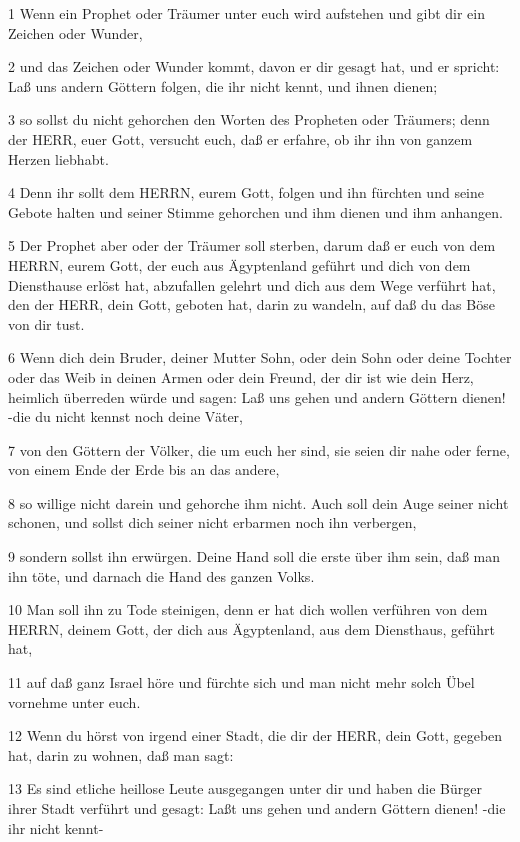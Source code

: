 \par 1 Wenn ein Prophet oder Träumer unter euch wird aufstehen und gibt dir ein Zeichen oder Wunder,
\par 2 und das Zeichen oder Wunder kommt, davon er dir gesagt hat, und er spricht: Laß uns andern Göttern folgen, die ihr nicht kennt, und ihnen dienen;
\par 3 so sollst du nicht gehorchen den Worten des Propheten oder Träumers; denn der HERR, euer Gott, versucht euch, daß er erfahre, ob ihr ihn von ganzem Herzen liebhabt.
\par 4 Denn ihr sollt dem HERRN, eurem Gott, folgen und ihn fürchten und seine Gebote halten und seiner Stimme gehorchen und ihm dienen und ihm anhangen.
\par 5 Der Prophet aber oder der Träumer soll sterben, darum daß er euch von dem HERRN, eurem Gott, der euch aus Ägyptenland geführt und dich von dem Diensthause erlöst hat, abzufallen gelehrt und dich aus dem Wege verführt hat, den der HERR, dein Gott, geboten hat, darin zu wandeln, auf daß du das Böse von dir tust.
\par 6 Wenn dich dein Bruder, deiner Mutter Sohn, oder dein Sohn oder deine Tochter oder das Weib in deinen Armen oder dein Freund, der dir ist wie dein Herz, heimlich überreden würde und sagen: Laß uns gehen und andern Göttern dienen! -die du nicht kennst noch deine Väter,
\par 7 von den Göttern der Völker, die um euch her sind, sie seien dir nahe oder ferne, von einem Ende der Erde bis an das andere,
\par 8 so willige nicht darein und gehorche ihm nicht. Auch soll dein Auge seiner nicht schonen, und sollst dich seiner nicht erbarmen noch ihn verbergen,
\par 9 sondern sollst ihn erwürgen. Deine Hand soll die erste über ihm sein, daß man ihn töte, und darnach die Hand des ganzen Volks.
\par 10 Man soll ihn zu Tode steinigen, denn er hat dich wollen verführen von dem HERRN, deinem Gott, der dich aus Ägyptenland, aus dem Diensthaus, geführt hat,
\par 11 auf daß ganz Israel höre und fürchte sich und man nicht mehr solch Übel vornehme unter euch.
\par 12 Wenn du hörst von irgend einer Stadt, die dir der HERR, dein Gott, gegeben hat, darin zu wohnen, daß man sagt:
\par 13 Es sind etliche heillose Leute ausgegangen unter dir und haben die Bürger ihrer Stadt verführt und gesagt: Laßt uns gehen und andern Göttern dienen! -die ihr nicht kennt-
